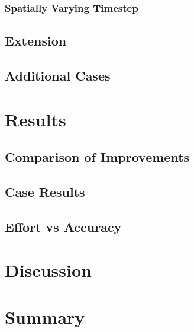 \documentclass{article}
\begin{document}
\subsubsection{Spatially Varying Timestep}


\subsection{Extension}


\subsection{Additional Cases}


\section{Results}

\subsection{Comparison of Improvements}

\subsection{Case Results}

\subsection{Effort vs Accuracy}

\section{Discussion}

\section{Summary}
\end{document}

